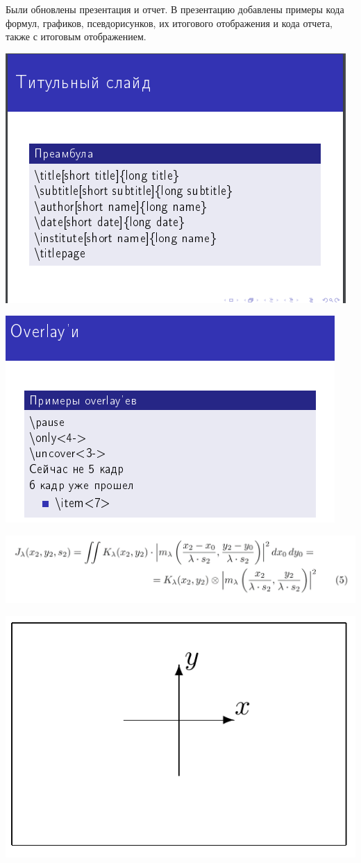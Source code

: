 \documentclass{article}
\begin{document}
	Были обновлены презентация и отчет. В презентацию добавлены примеры кода формул, графиков, псевдорисунков, их итогового отображения и кода отчета, также с итоговым отображением.
	
	\includegraphics{9}
	
	\includegraphics{10}
	
	\includegraphics{11}
	
	\includegraphics{12}
	
\end{document}
